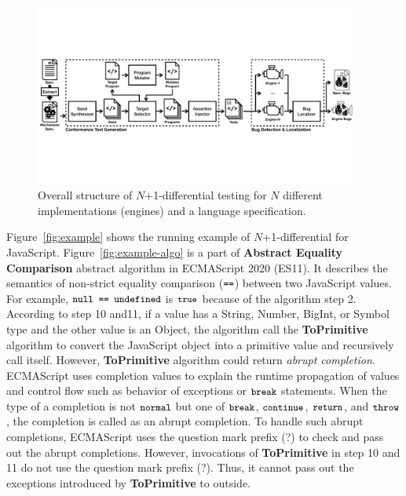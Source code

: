 \begin{figure}[t]
  \centering
  \includegraphics[width=0.95\textwidth]{img/n+1-differential-testing.pdf}
  \caption{Overall structure of $N$+1-differential testing for $N$ different
    implementations (engines) and a language specification.}
  \label{fig:overall}
  \vspace*{-1em}
\end{figure}

Figure~\ref{fig:example} shows the running example of $N$+1-differential for
JavaScript.  Figure~\ref{fig:example-algo} is a part of \textbf{Abstract Equality
Comparison} abstract algorithm in ECMAScript 2020 (ES11).  It describes the
semantics of non-strict equality comparison ($\code{==}$) between two JavaScript
values.  For example, $\code{null == undefined}$ is $\code{true}$ because of the
algorithm step 2.  According to step 10 and11, if a value has a String, Number,
BigInt, or Symbol type and the other value is an Object, the algorithm call the
\textbf{ToPrimitive} algorithm to convert the JavaScript object into a primitive
value and recursively call itself.  However, \textbf{ToPrimitive} algorithm
could return \textit{abrupt completion}.  ECMAScript uses completion values to
explain the runtime propagation of values and control flow such as behavior of
exceptions or $\code{break}$ statements.  When the type of a completion is not
$\code{normal}$ but one of $\code{break}$, $\code{continue}$, $\code{return}$,
and $\code{throw}$, the completion is called as an abrupt completion.  To handle
such abrupt completions, ECMAScript uses the question mark prefix (?) to check
and pass out the abrupt completions.  However, invocations of
\textbf{ToPrimitive} in step 10 and 11 do not use the question mark prefix (?).
Thus, it cannot pass out the exceptions introduced by \textbf{ToPrimitive} to
outside.

